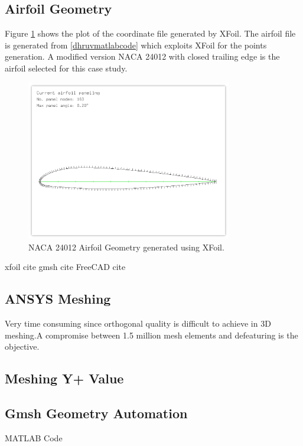 \documentclass[english]{kththesis}
\begin{document}
\subsection{Airfoil Geometry} \label{subsec:airfoil_geometry}
Figure \ref{fig:xfoil2} shows the plot of the coordinate file generated by XFoil.
The airfoil file is generated from \ref{dhruvmatlabcode} which exploits XFoil for the points generation. A modified version NACA 24012 with closed trailing edge is the airfoil selected for this case study. 
\begin{figure}[!htb]
    \centering
    \includegraphics[width=0.8\textwidth]{IPS/xfoil2.png}
    \caption{NACA 24012 Airfoil Geometry generated using XFoil.}
    \label{fig:xfoil2}
\end{figure}
xfoil cite\cite{xfoil}
gmsh cite\cite{gmsh}
FreeCAD cite
\subsection{ANSYS Meshing}
Very time consuming since orthogonal quality is difficult to achieve in 3D meshing.A compromise between 1.5 million mesh elements and defeaturing is the objective.
\subsection{Meshing Y+ Value}
\subsection{Gmsh Geometry Automation} \label{subsec:gmsh_geometry}
MATLAB Code
\end{document}
